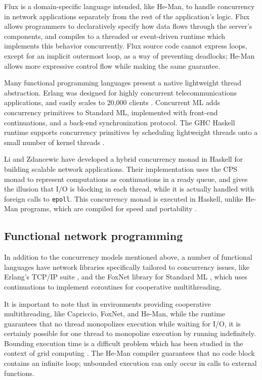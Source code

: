 \documentclass[preprint]{sigplanconf}
\renewcommand{\t}{\texttt}
\begin{document}
Flux \cite{BurnsEtAl} is a domain-specific language intended, like He-Man, to
handle concurrency in network applications separately from the rest of the
application's logic. Flux allows programmers to declaratively specify how data
flows through the server's components, and compiles to a threaded or
event-driven runtime which implements this behavior concurrently. Flux source
code cannot express loops, except for an implicit outermost loop, as a way of
preventing deadlocks; He-Man allows more expressive control flow while making
the same guarantee.

Many functional programming languages present a native lightweight thread
abstraction. Erlang \cite{VirdingEtAl} was designed for highly concurrent
telecommunications applications, and easily scales to 20,000 clients
\cite{Hellstrom}. Concurrent ML \cite{ReppyEtAl} adds concurrency primitives to
Standard ML, implemented with front-end continuations, and a back-end
synchronization protocol. The GHC Haskell runtime supports concurrency
primitives \cite{LiEtAl} by scheduling lightweight threads onto a small number
of kernel threads \cite{MarlowEtAl}.

Li and Zdancewic \cite{LiZdancewic} have developed a hybrid concurrency monad in
Haskell for building scalable network applications. Their implementation uses
the CPS monad to represent computations as continuations in a ready queue, and
gives the illusion that I/O is blocking in each thread, while it is actually
handled with foreign calls to \t{epoll}. This concurrency monad is executed in
Haskell, unlike He-Man programs, which are compiled for speed and portability
\cite{ElliottEtAl}.

\subsection{Functional network programming}

In addition to the concurrency models mentioned above, a number of functional
languages have network libraries specifically tailored to concurrency issues,
like Erlang's TCP/IP suite \cite{ParisEtAl}, and the FoxNet library for Standard
ML \cite{BiagioniEtAl}, which uses continuations to implement coroutines for
cooperative multithreading.

It is important to note that in environments providing cooperative
multithreading, like Capriccio, FoxNet, and He-Man, while the runtime guarantees
that no thread monopolizes execution while waiting for I/O, it is certainly
possible for one thread to monopolize execution by running indefinitely.
Bounding execution time is a difficult problem which has been studied in the
context of grid computing \cite{VanderwaartCrary}. The He-Man compiler
guarantees that no code block contains an infinite loop; unbounded execution can
only occur in calls to external functions.
\end{document}
